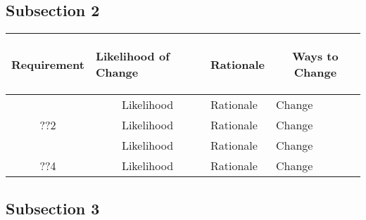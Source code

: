 \documentclass [11pt]{article}
\begin{document}
\subsection{Subsection 2}

\begin{longtable}{| p{ } | p{ } |  p{ } | p{ } |}\hline 
\multicolumn{1}{|c|}{\textbf {Requirement}} & 
\begin{minipage}{.14 \columnwidth}\begin{center}\vspace{1.5mm}\textbf{Likelihood of Change}   \vspace{1.5mm} \end{center}\end{minipage}& 
\multicolumn{1}{c|}{\textbf {Rationale}} & \multicolumn{1}{c|}{\textbf {Ways to Change}} \\ \hline

\rowcolor{tableCell} \multicolumn{1}{|c|}{??1}& 
\multicolumn{1}{|c|}{Likelihood} & Rationale & Change \\ \hline

\multicolumn{1}{|c|}{??2}& 
\multicolumn{1}{|c|}{Likelihood} & Rationale & Change \\ \hline

\rowcolor{tableCell} \multicolumn{1}{|c|}{??3}& 
\multicolumn{1}{|c|}{Likelihood} & Rationale & Change \\ \hline

\multicolumn{1}{|c|}{??4}& 
\multicolumn{1}{|c|}{Likelihood} & Rationale & Change \\ \hline
\end{longtable}

\subsection{Subsection 3}
\end{document}
